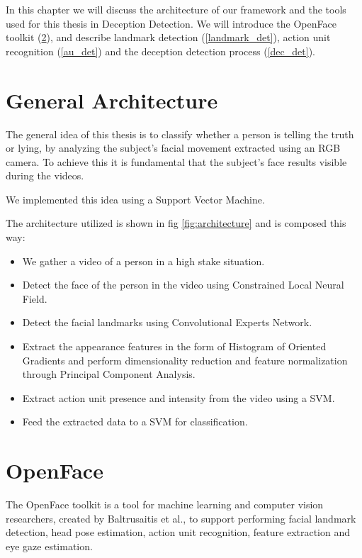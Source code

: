 In this chapter we will discuss the architecture of our framework and the tools used for this thesis in Deception Detection. We will introduce the OpenFace toolkit (\ref{OpenFace}), and describe landmark detection (\ref{landmark_det}), action unit recognition (\ref{au_det}) and the deception detection process (\ref{dec_det}).

\section{General Architecture}
The general idea of this thesis is to classify whether a person is telling the truth or lying, by analyzing the subject's facial movement extracted using an RGB camera. To achieve this it is fundamental that the subject's face results visible during the videos.

We implemented this idea using a Support Vector Machine. 

The architecture utilized is shown in fig \ref{fig:architecture} and is composed this way:

\begin{itemize}
	\item We gather a video of a person in a high stake situation.
	\item Detect the face of the person in the video using Constrained Local Neural Field.
	\item Detect the facial landmarks using Convolutional Experts Network.
	\item Extract the appearance features in the form of Histogram of Oriented Gradients and perform dimensionality reduction and feature normalization through Principal Component Analysis.
	\item Extract action unit presence and intensity from the video using a SVM.
	\item Feed the extracted data to a SVM for classification.
\end{itemize}

\clearpage

\section{OpenFace} \label{OpenFace}
The OpenFace \cite{Baltru2018} toolkit is a tool for machine learning and computer vision researchers, created by Baltrusaitis et al., to support performing facial landmark detection, head pose estimation, action unit recognition, feature extraction and eye gaze estimation. 

